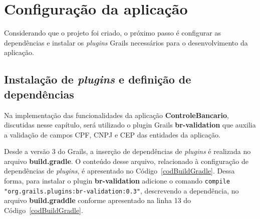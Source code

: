 \newpage

\section{Configuração da aplicação} 

\vspace{0.5cm}

Considerando  que  o  projeto  foi  criado,  o próximo  passo  é  configurar  as
dependências   e  instalar   os  {\it   plugins}  Grails   necessários   para  o
desenvolvimento da aplicação.  

\subsection{Instalação     de      {\it     plugins}     e      definição     de
  dependências}\label{secPlugins}

\vspace{0.5cm}

Na  implementação  das  funcionalidades  da  aplicação  {\bf  ControleBancario},
discutidas nesse  capítulo, será utilizado  o plugin Grails  {\bf br-validation}
que auxilia a validação de campos CPF, CNPJ e CEP das entidades da aplicação. 

\vspace{0.5cm}

Desde  a versão  3 do  Grails, a  inserção de  dependências de  {\it  plugins} é
realizada no arquivo {\bf build.gradle}. O conteúdo desse arquivo, relacionado à
configuração   de   dependências   de    {\it   plugins},   é   apresentado   no
Código~\ref{codBuildGradle}.  Dessa forma, para instalar  o plugin {\bf
  br-validation}        adicione         o        comando        \texttt{compile
  "org.grails.plugins:br-validation:0.3"}, descrevendo a dependência, no arquivo
{\bf     build.graddle}    conforme     apresentado    na     linha     13    do
Código~\ref{codBuildGradle}.
  

\vspace{0.5cm}

